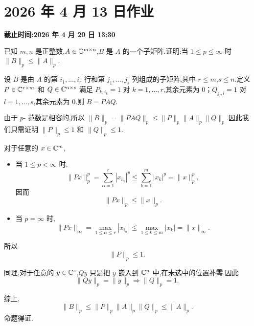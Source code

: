 \section*{2026 年 4 月 13 日作业}
{}
\noindent\textbf{截止时间:2026 年 4 月 20 日 13:30}
\setcounter{problem}{0}
\setcounter{sollemma}{0}

\begin{problem}
已知 $m,n$ 是正整数,$A\in\mathbb{C}^{m\times n}$,$B$ 是 $A$ 的一个子矩阵.证明:当 $1\le p\le\infty$ 时 $\|B\|_p\le\|A\|_p$.
\begin{solution}
    设 $B$ 是由 $A$ 的第 $i_1,\dots,i_{r}$ 行和第 $j_1,\dots,j_{s}$ 列组成的子矩阵,其中 $r\le m$,$s\le n$.定义 $P \in \mathbb{C}^{r \times m}$ 和 $Q \in \mathbb{C}^{n \times s}$ 满足 $P_{k,i_k} = 1$ 对 $k=1,\dots,r$,其余元素为 $0$；$Q_{j_l,l} = 1$ 对 $l=1,\dots,s$,其余元素为 $0$.则 $B = P A Q$.

    由于 $p$- 范数是相容的,所以 $\|B\|_p = \|P A Q\|_p \le \|P\|_p \|A\|_p \|Q\|_p$.因此我们只需证明 $\|P\|_p \le 1$ 和 $\|Q\|_p \le 1$.

    对于任意的 $x \in \mathbb{C}^m$,
    \begin{itemize}
        \item 当 $1\le p<\infty$ 时,
        \[
            \|Px\|_p^p=\sum_{\alpha=1}^{r}|x_{i_\alpha}|^p
            \le
            \sum_{k=1}^{m}|x_k|^p
            =
            \|x\|_p^p,
        \]
        因而
        \[
            \|Px\|_p\le \|x\|_p.
        \]

        \item 当 $p=\infty$ 时,
        \[
            \|Px\|_{\infty}
            =
            \max_{1\le\alpha\le r}|x_{i_\alpha}|
            \le
            \max_{1\le k\le m}|x_k|
            =
            \|x\|_{\infty}.
        \]
    \end{itemize}

    所以
    \[
        \|P\|_p\le 1.
    \]

    同理,对于任意的 $y\in\mathbb{C}^s$,$Qy$ 只是把 $y$ 嵌入到 $\mathbb{C}^n$ 中,在未选中的位置补零.因此
    \[
        \|Qy\|_p=\|y\|_p \Rightarrow \|Q\|_p=1.
    \]
    
    综上,
    \[
        \|B\|_p
        \le
        \|P\|_p\|A\|_p\|Q\|_p
        \le
        \|A\|_p.
    \]
    命题得证.
\end{solution}
\end{problem}

